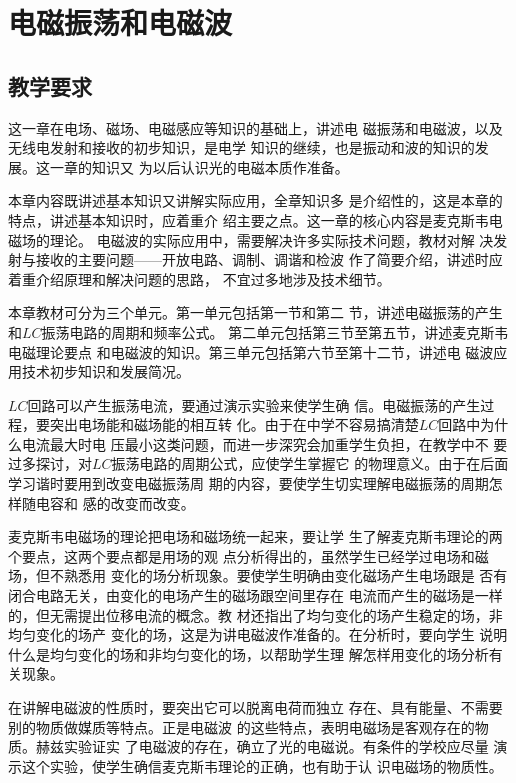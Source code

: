 \chapter{电磁振荡和电磁波}\minitoc[n]
\section{教学要求}

这一章在电场、磁场、电磁感应等知识的基础上，讲述电
磁振荡和电磁波，以及无线电发射和接收的初步知识，是电学
知识的继续，也是振动和波的知识的发展。这一章的知识又
为以后认识光的电磁本质作准备。

本章内容既讲述基本知识又讲解实际应用，全章知识多
是介绍性的，这是本章的特点，讲述基本知识时，应着重介
绍主要之点。这一章的核心内容是麦克斯韦电磁场的理论。
电磁波的实际应用中，需要解决许多实际技术问题，教材对解
决发射与接收的主要问题——开放电路、调制、调谐和检波
作了简要介绍，讲述时应着重介绍原理和解决问题的思路，
不宜过多地涉及技术细节。

本章教材可分为三个单元。第一单元包括第一节和第二
节，讲述电磁振荡的产生和$LC$振荡电路的周期和频率公式。
第二单元包括第三节至第五节，讲述麦克斯韦电磁理论要点
和电磁波的知识。第三单元包括第六节至第十二节，讲述电
磁波应用技术初步知识和发展简况。

$LC$回路可以产生振荡电流，要通过演示实验来使学生确
信。电磁振荡的产生过程，要突出电场能和磁场能的相互转
化。由于在中学不容易搞清楚$LC$回路中为什么电流最大时电
压最小这类问题，而进一步深究会加重学生负担，在教学中不
要过多探讨，对$LC$振荡电路的周期公式，应使学生掌握它
的物理意义。由于在后面学习谐时要用到改变电磁振荡周
期的内容，要使学生切实理解电磁振荡的周期怎样随电容和
感的改变而改变。

麦克斯韦电磁场的理论把电场和磁场统一起来，要让学
生了解麦克斯韦理论的两个要点，这两个要点都是用场的观
点分析得出的，虽然学生已经学过电场和磁场，但不熟悉用
变化的场分析现象。要使学生明确由变化磁场产生电场跟是
否有闭合电路无关，由变化的电场产生的磁场跟空间里存在
电流而产生的磁场是一样的，但无需提出位移电流的概念。教
材还指出了均匀变化的场产生稳定的场，非均匀变化的场产
变化的场，这是为讲电磁波作准备的。在分析时，要向学生
说明什么是均匀变化的场和非均匀变化的场，以帮助学生理
解怎样用变化的场分析有关现象。

在讲解电磁波的性质时，要突出它可以脱离电荷而独立
存在、具有能量、不需要别的物质做媒质等特点。正是电磁波
的这些特点，表明电磁场是客观存在的物质。赫兹实验证实
了电磁波的存在，确立了光的电磁说。有条件的学校应尽量
演示这个实验，使学生确信麦克斯韦理论的正确，也有助于认
识电磁场的物质性。

